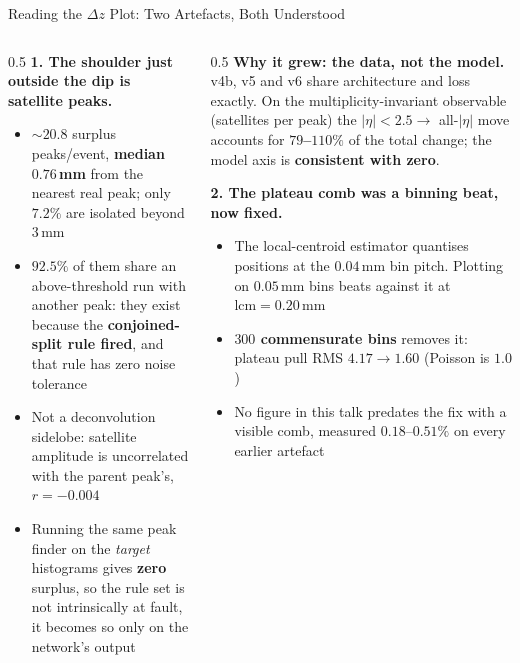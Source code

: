 \documentclass[xcolor=table,aspectratio=169]{beamer}
\begin{document}
\begin{frame}[shrink=15]{Reading the $\Delta z$ Plot: Two Artefacts, Both Understood}
    \begin{columns}[t]
        \begin{column}{0.5\linewidth}
            \small
            \textbf{1. The shoulder just outside the dip is satellite peaks.}
            \begin{itemize}\setlength\itemsep{0.2em}
                \item ${\sim}20.8$ surplus peaks/event, \textbf{median $0.76$\,mm} from
                    the nearest real peak; only $7.2\%$ are isolated beyond $3$\,mm
                \item \textbf{$92.5\%$} of them share an above-threshold run with
                    another peak: they exist because the \textbf{conjoined-split rule
                    fired}, and that rule has zero noise tolerance
                \item \textcolor{black!60}{Not a deconvolution sidelobe: satellite
                    amplitude is uncorrelated with the parent peak's,
                    $r = -0.004$}
                \item Running the same peak finder on the \emph{target} histograms
                    gives \textbf{zero} surplus, so the rule set is not intrinsically
                    at fault, it becomes so only on the network's output
            \end{itemize}
        \end{column}
        \begin{column}{0.5\linewidth}
            \small
            \textbf{Why it grew: the data, not the model.}
            v4b, v5 and v6 share architecture and loss exactly. On the
            multiplicity-invariant observable (satellites per peak) the
            $|\eta|<2.5 \to$ all-$|\eta|$ move accounts for \textbf{$79$--$110\%$} of
            the total change; the model axis is \textbf{consistent with zero}.
            \vspace{0.5em}

            \textbf{2. The plateau comb was a binning beat, now fixed.}
            \begin{itemize}\setlength\itemsep{0.2em}
                \item The local-centroid estimator quantises positions at the
                    $0.04$\,mm bin pitch. Plotting on $0.05$\,mm bins beats against it
                    at $\mathrm{lcm}=0.20$\,mm
                \item \textbf{$300$ commensurate bins} removes it: plateau pull RMS
                    $4.17 \to 1.60$ (Poisson is $1.0$)
                \item \textcolor{black!60}{No figure in this talk predates the fix
                    with a visible comb, measured $0.18$--$0.51\%$ on every
                    earlier artefact}
            \end{itemize}
        \end{column}
    \end{columns}
\end{frame}
\end{document}
